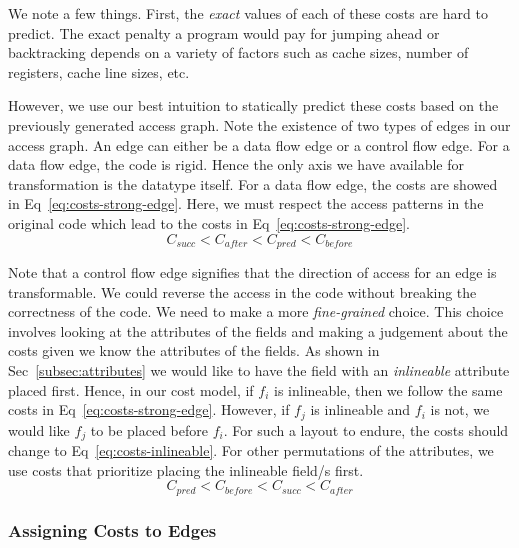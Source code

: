 \documentclass[acmsmall,review,anonymous]{acmart}\settopmatter{printfolios=true,printccs=false,printacmref=false}
\begin{document}
We note a few things. 
First, the {\em exact} values of each of these costs are hard to predict. 
The exact penalty a program would pay for jumping ahead or backtracking depends on a variety of factors such as cache sizes, number of registers, cache line sizes, etc.


However, we use our best intuition to statically predict these costs based on the previously generated access graph.
Note the existence of two types of edges in our access graph. An edge can either be a data flow edge or a control flow edge.
For a data flow edge, the code is rigid. Hence the only axis we have available for transformation is the datatype itself. For a data flow edge, the costs are showed in Eq~\ref{eq:costs-strong-edge}. Here, we must respect the access patterns in the original code which lead to the costs in Eq~\ref{eq:costs-strong-edge}.
\begin{equation}
C_{\mathit{succ}} < C_\mathit{after} < C_\mathit{pred} < C_\mathit{before}
\label{eq:costs-strong-edge}
\end{equation}

Note that a control flow edge signifies that the direction of access for an edge is transformable. We could reverse the access in the code without breaking the correctness of the code. We need to make a more \textit{fine-grained} choice.
This choice involves looking at the attributes of the fields and making a judgement about the costs given we know the attributes of the fields. As shown in Sec~\ref{subsec:attributes} we would like to have the field with an \textit{inlineable} attribute placed first.
Hence, in our cost model, if $f_i$ is inlineable, then we follow the same costs in Eq~\ref{eq:costs-strong-edge}. However, if $f_j$ is inlineable and $f_i$ is not, we would like $f_j$ to be placed before $f_i$. For such a layout to endure, the costs should change to Eq~\ref{eq:costs-inlineable}.
For other permutations of the attributes, we use costs that prioritize placing the inlineable field/s first. 
\begin{equation}
C_\mathit{pred} < C_\mathit{before} < C_{\mathit{succ}} < C_\mathit{after}
\label{eq:costs-inlineable}
\end{equation}


\subsubsection{Assigning Costs to Edges}
\end{document}
